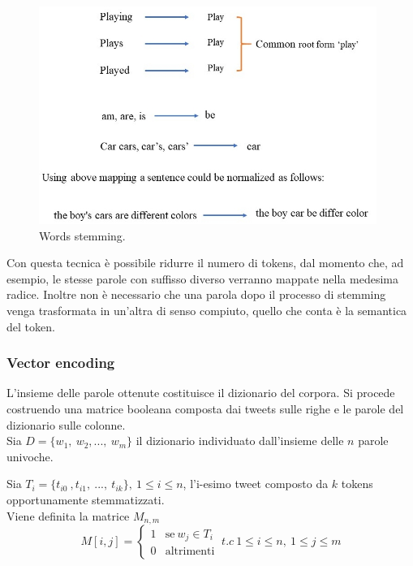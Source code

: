 \documentclass[oneside]{book}
\begin{document}
\begin{figure}[!h]
	\centering
	\includegraphics[width=11cm]{assets/stemming.jpg}

	\caption[Caption for LOF]{Words stemming.\footnotemark}
	\label{fig:stemming}
\end{figure}




Con questa tecnica è possibile ridurre il numero di tokens, dal momento che, ad esempio, le stesse parole con suffisso diverso verranno mappate nella medesima radice. Inoltre non è necessario che una parola dopo il processo di stemming venga trasformata in un'altra di senso compiuto, quello che conta è la semantica del token.


\subsubsection{Vector encoding}

L'insieme delle parole ottenute costituisce il dizionario del corpora. Si procede costruendo una matrice booleana composta dai tweets sulle righe e le parole del dizionario sulle colonne.\\

Sia $D = \{w_1,\ w_2, ...,\ w_m\}$ il dizionario individuato dall'insieme delle $n$ parole univoche.

Sia $T_i = \{t_{i0}\ ,t_{i1},\ ...,\ t_{ik}\}, \ 1 \leq i \leq n$, l'i-esimo tweet composto da $k$ tokens opportunamente stemmatizzati.\\
Viene definita la matrice $M_{n,m}$
\[
M[i,j] =
\begin{cases}
1 & \text{se}\ w_j \in T_i\\
0 & \text{altrimenti}
\end{cases}
\ t.c\ 1\leq i\leq n,\ 1 \leq j \leq m
\]
\end{document}
